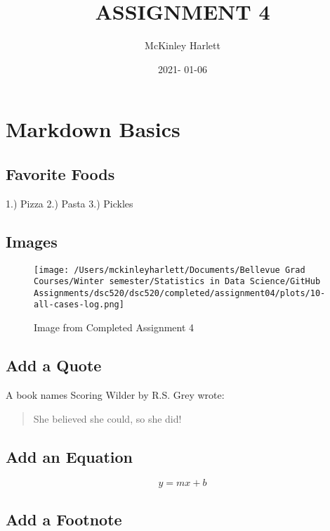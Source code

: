 \documentclass[
]{article}
\title{ASSIGNMENT 4}
\author{McKinley Harlett}
\date{2021- 01-06}
\begin{document}
\maketitle

\hypertarget{markdown-basics}{%
\section{Markdown Basics}\label{markdown-basics}}

\hypertarget{favorite-foods}{%
\subsection{Favorite Foods}\label{favorite-foods}}

1.) Pizza 2.) Pasta 3.) Pickles

\hypertarget{images}{%
\subsection{Images}\label{images}}

\begin{figure}
\centering
\texttt{[image: /Users/mckinleyharlett/Documents/Bellevue Grad Courses/Winter semester/Statistics in Data Science/GitHub Assignments/dsc520/dsc520/completed/assignment04/plots/10-all-cases-log.png]}
\caption{Image from Completed Assignment 4}
\end{figure}

\hypertarget{add-a-quote}{%
\subsection{Add a Quote}\label{add-a-quote}}

A book names Scoring Wilder by R.S. Grey wrote:

\begin{quote}
She believed she could, so she did!
\end{quote}

\hypertarget{add-an-equation}{%
\subsection{Add an Equation}\label{add-an-equation}}

\[ y=mx+b \]

\hypertarget{add-a-footnote}{%
\subsection{Add a Footnote}\label{add-a-footnote}}
\end{document}
